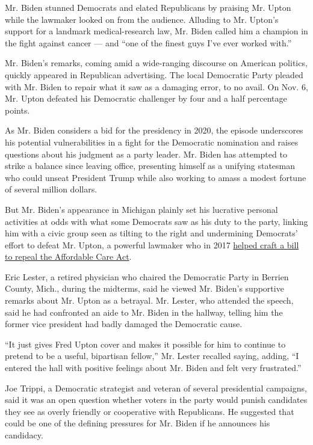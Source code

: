 Mr. Biden stunned Democrats and elated Republicans by praising Mr. Upton
while the lawmaker looked on from the audience. Alluding to Mr. Upton's
support for a landmark medical-research law, Mr. Biden called him a
champion in the fight against cancer --- and ``one of the finest guys
I've ever worked with.''

Mr. Biden's remarks, coming amid a wide-ranging discourse on American
politics, quickly appeared in Republican advertising. The local
Democratic Party pleaded with Mr. Biden to repair what it saw as a
damaging error, to no avail. On Nov. 6, Mr. Upton defeated his
Democratic challenger by four and a half percentage points.

As Mr. Biden considers a bid for the presidency in 2020, the episode
underscores his potential vulnerabilities in a fight for the Democratic
nomination and raises questions about his judgment as a party leader.
Mr. Biden has attempted to strike a balance since leaving office,
presenting himself as a unifying statesman who could unseat President
Trump while also working to amass a modest fortune of several million
dollars.

But Mr. Biden's appearance in Michigan plainly set his lucrative
personal activities at odds with what some Democrats saw as his duty to
the party, linking him with a civic group seen as tilting to the right
and undermining Democrats' effort to defeat Mr. Upton, a powerful
lawmaker who in 2017
\href{https://www.nytimes3xbfgragh.onion/2017/05/02/us/politics/health-care-paul-ryan-fred-upton-congress.html}{helped
craft a bill to repeal the Affordable Care Act}.

Eric Lester, a retired physician who chaired the Democratic Party in
Berrien County, Mich., during the midterms, said he viewed Mr. Biden's
supportive remarks about Mr. Upton as a betrayal. Mr. Lester, who
attended the speech, said he had confronted an aide to Mr. Biden in the
hallway, telling him the former vice president had badly damaged the
Democratic cause.

``It just gives Fred Upton cover and makes it possible for him to
continue to pretend to be a useful, bipartisan fellow,'' Mr. Lester
recalled saying, adding, ``I entered the hall with positive feelings
about Mr. Biden and felt very frustrated.''

Joe Trippi, a Democratic strategist and veteran of several presidential
campaigns, said it was an open question whether voters in the party
would punish candidates they see as overly friendly or cooperative with
Republicans. He suggested that could be one of the defining pressures
for Mr. Biden if he announces his candidacy.

